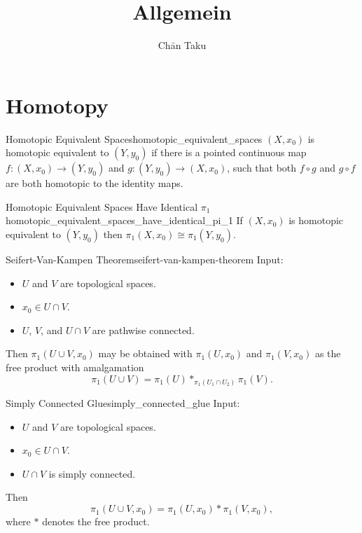 \documentclass{article}
\title{Allgemein}
\author{Ch\=an Taku}
\begin{document}
\maketitle

\section{Homotopy}

\begin{definition}{Homotopic Equivalent Spaces}{homotopic_equivalent_spaces}
    $(X,x_0)$ is homotopic equivalent to $(Y,y_0)$ if there is a pointed continuous map $f:(X,x_0) \rightarrow (Y,y_0)$ and $g:(Y,y_0) \rightarrow (X,x_0)$, such that both $f\circ g$ and $g\circ f$ are both homotopic to the identity maps.
\end{definition}

\begin{proposition}{Homotopic Equivalent Spaces Have Identical $\pi_1$}{homotopic_equivalent_spaces_have_identical_pi_1}
    If $(X,x_0)$ is homotopic equivalent to $(Y,y_0)$ then $\pi_1(X,x_0) \cong \pi_1(Y,y_0)$.
\end{proposition}

\begin{theorem}{Seifert-Van-Kampen Theorem}{seifert-van-kampen-theorem}
    Input:
    \begin{itemize}
        \item $U$ and $V$ are topological spaces.
        \item $x_0\in U\cap V$.
        \item $U$, $V$, and $U\cap V$ are pathwise connected.
    \end{itemize}
    Then $\pi_1(U\cup V,x_0)$ may be obtained with $\pi_1(U,x_0)$ and $\pi_1(V,x_0)$ as the free product with amalgamation
    \[ \pi_1(U\cup V) = \pi_1(U) *_{\pi_1(U_1\cap U_2)} \pi_1(V). \]
\end{theorem}

\begin{corollary}{Simply Connected Glue}{simply_connected_glue}
    Input:
    \begin{itemize}
        \item $U$ and $V$ are topological spaces.
        \item $x_0\in U\cap V$.
        \item $U\cap V$ is simply connected.
    \end{itemize}
    Then
    \[ \pi_1(U\cup V, x_0) = \pi_1(U,x_0) * \pi_1(V,x_0), \]
    where $*$ denotes the free product.
\end{corollary}
\end{document}
